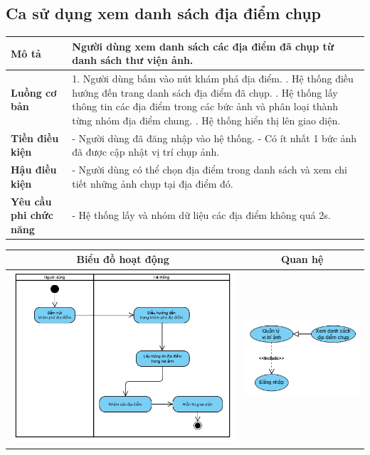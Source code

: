 \subsection{Ca sử dụng xem danh sách địa điểm chụp}

\vspace{0.5cm}

\noindent 
\begin{tabularx}{\linewidth}{| l | X |} 
\hline 
\textbf{Mô tả} & Người dùng xem danh sách các địa điểm đã chụp từ danh sách thư viện ảnh. \\
\hline 
\textbf{Luồng cơ bản} & 1. Người dùng bấm vào nút khám phá địa điểm. \newline
                       2. Hệ thống điều hướng đến trang danh sách địa điểm đã chụp. \newline
                       3. Hệ thống lấy thông tin các địa điểm trong các bức ảnh và phân loại thành từng nhóm địa điểm chung. \newline
                       5. Hệ thống hiển thị lên giao diện. \\
\hline
\textbf{Tiền điều kiện} & - Người dùng đã đăng nhập vào hệ thống. \newline
                          - Có ít nhất 1 bức ảnh đã được cập nhật vị trí chụp ảnh. \\
\hline
\textbf{Hậu điều kiện} & - Người dùng có thể chọn địa điểm trong danh sách và xem chi tiết những ảnh chụp tại địa điểm đó. \\
\hline 
\textbf{Yêu cầu phi chức năng} & - Hệ thống lấy và nhóm dữ liệu các địa điểm không quá 2s. \\
\hline 
\end{tabularx}

\vspace{0.8cm}

\noindent 
\begin{tabular}{| c | c |}
    \hline
    \textbf{Biểu đồ hoạt động} & \textbf{Quan hệ} \\ 
    \hline
    \includegraphics[width=0.6\linewidth]{figures/c3/3-3-13-activity-diagram.png} 
    &  
    \includegraphics[width=0.35\linewidth]{figures/c3/3-3-13-relationship.png} \\ 
    \hline
\end{tabular}

